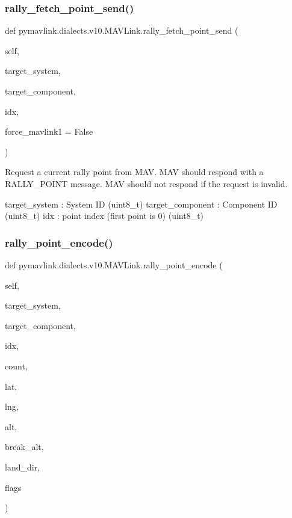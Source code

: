 \begin{DoxyVerb}
\begin{DoxyVerb}
\begin{DoxyVerb}
\begin{DoxyVerb}
\subsubsection{\texorpdfstring{rally\+\_\+fetch\+\_\+point\+\_\+send()}{rally\_fetch\_point\_send()}}
{\footnotesize\ttfamily def pymavlink.\+dialects.\+v10.\+M\+A\+V\+Link.\+rally\+\_\+fetch\+\_\+point\+\_\+send (\begin{DoxyParamCaption}\item[{}]{self,  }\item[{}]{target\+\_\+system,  }\item[{}]{target\+\_\+component,  }\item[{}]{idx,  }\item[{}]{force\+\_\+mavlink1 = {\ttfamily False} }\end{DoxyParamCaption})}

\begin{DoxyVerb}Request a current rally point from MAV. MAV should respond with a
RALLY_POINT message. MAV should not respond if the
request is invalid.

target_system             : System ID (uint8_t)
target_component          : Component ID (uint8_t)
idx                       : point index (first point is 0) (uint8_t)\end{DoxyVerb}
 \mbox{\label{classpymavlink_1_1dialects_1_1v10_1_1MAVLink_a88d5ff5e6b7aed30ee57e7635bd80b6e}} 
\subsubsection{\texorpdfstring{rally\+\_\+point\+\_\+encode()}{rally\_point\_encode()}}
{\footnotesize\ttfamily def pymavlink.\+dialects.\+v10.\+M\+A\+V\+Link.\+rally\+\_\+point\+\_\+encode (\begin{DoxyParamCaption}\item[{}]{self,  }\item[{}]{target\+\_\+system,  }\item[{}]{target\+\_\+component,  }\item[{}]{idx,  }\item[{}]{count,  }\item[{}]{lat,  }\item[{}]{lng,  }\item[{}]{alt,  }\item[{}]{break\+\_\+alt,  }\item[{}]{land\+\_\+dir,  }\item[{}]{flags }\end{DoxyParamCaption})}


\end{DoxyVerb}
\end{DoxyVerb}
\end{DoxyVerb}
\end{DoxyVerb}
